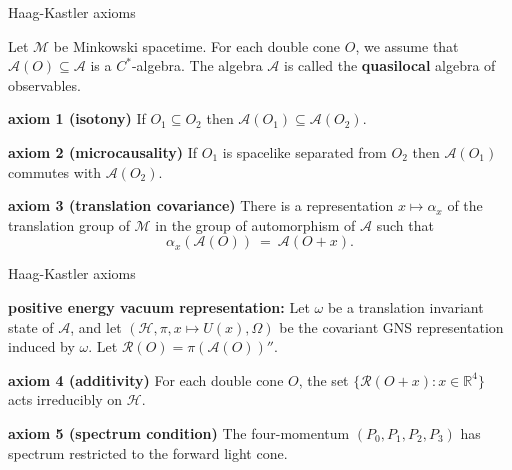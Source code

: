 \documentclass[8pt]{beamer}
\author{Hans Halvorson}
\date[November 2013]{November 12, 2013} \usetheme{Copenhagen}
\begin{document}
\def\2{\mathcal}
\def\7{\mathbb}
\newenvironment{proenv}{\only{\setbeamercolor{local structure}{fg=green}}}{}
\newenvironment{conenv}{\only{\setbeamercolor{local structure}{fg=red}}}{}  
\newenvironment{neuenv}{\only{\setbeamercolor{local
      structure}{fg=yellow}}}{}


\newcommand{\3}{\mathfrak}

\begin{frame}[plain]
  \titlepage
\end{frame}

\begin{frame}{Haag-Kastler axioms}

  Let $\2M$ be Minkowski spacetime.  For each double cone $O$, we
  assume that $\2A (O)\subseteq \2A$ is a $C^*$-algebra.  The algebra
  $\2A$ is called the \textbf{quasilocal} algebra of observables.

  \bigskip \textbf{axiom 1 (isotony)} If $O_1\subseteq O_2$ then $\2A
  (O_1)\subseteq \2A (O_2)$.

  \bigskip \textbf{axiom 2 (microcausality)} If $O_1$ is spacelike
  separated from $O_2$ then $\2A (O_1)$ commutes with $\2A (O_2)$.

  \bigskip \textbf{axiom 3 (translation covariance)} There is a
  representation $x\mapsto \alpha _x$ of the translation group of
  $\2M$ in the group of automorphism of $\2A$ such that
$$ \alpha _x(\2A (O)) \: =\: \2A (O+x) .$$

\end{frame}

\begin{frame}{Haag-Kastler axioms}

  \textbf{positive energy vacuum representation:} Let $\omega$ be a
  translation invariant state of $\2A$, and let $(\2H ,\pi ,x\mapsto
  U(x),\Omega )$ be the covariant GNS representation induced by
  $\omega$.  Let $\2R (O)=\pi (\2A (O))''$.

  \bigskip \textbf{axiom 4 (additivity)} For each double cone $O$, the
  set $\{ \2R (O+x) :x\in \7R ^ 4 \}$ acts irreducibly on $\2H$.

  \bigskip \textbf{axiom 5 (spectrum condition)} The four-momentum
  $(P_0,P_1,P_2,P_3)$ has spectrum restricted to the forward light
  cone.

\end{frame}
\end{document}
